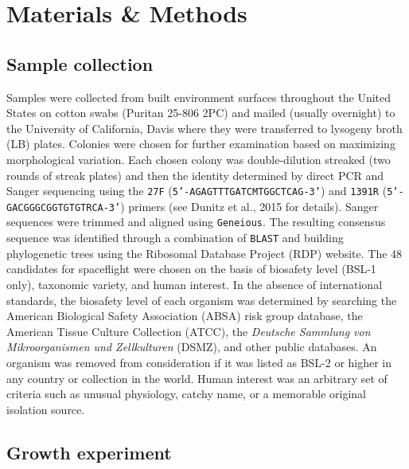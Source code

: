 \section{Materials \& Methods}

\subsection{Sample collection}

Samples were collected from built environment surfaces throughout the United States on cotton swabs (Puritan 25-806 2PC) and mailed (usually overnight) to the University of California, Davis where they were transferred to lysogeny broth (LB) plates. Colonies were chosen for further examination based on maximizing morphological variation. Each chosen colony was double-dilution streaked (two rounds of streak plates) and then the identity determined by direct PCR and Sanger sequencing using the {\tt 27F} ({\tt 5'-AGAGTTTGATCMTGGCTCAG-3'}) and {\tt 1391R} ({\tt 5'-GACGGGCGGTGTGTRCA-3'}) primers (see Dunitz et al., 2015 for details). Sanger sequences were trimmed and aligned using {\tt Geneious}. \cite{kearse_geneious_2012} The resulting consensus sequence was identified through a combination of {\tt BLAST} \cite{altschul_basic_1990} and building phylogenetic trees using the Ribosomal Database Project (RDP) website. \cite{cole_ribosomal_2014} The 48 candidates for spaceflight were chosen on the basis of biosafety level (BSL-1 only), taxonomic variety, and human interest. In the absence of international standards, the biosafety level of each organism was determined by searching the American Biological Safety Association (ABSA) risk group database, the American Tissue Culture Collection (ATCC), the {\em Deutsche Sammlung von Mikroorganismen und Zellkulturen} (DSMZ), and other public databases. An organism was removed from consideration if it was listed as BSL-2 or higher in any country or collection in the world. Human interest was an arbitrary set of criteria such as unusual physiology, catchy name, or a memorable original isolation source.

\subsection{Growth experiment}

